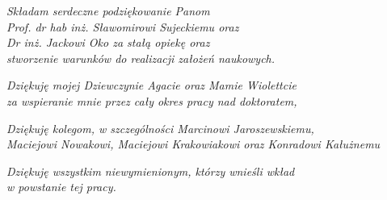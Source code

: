 


\begin{flushleft}
\vspace{1cm}
\emph{Składam serdeczne podziękowanie Panom \\
Prof. dr hab inż. Sławomirowi Sujeckiemu oraz \\
Dr inż. Jackowi Oko za stałą opiekę oraz \\
stworzenie warunków do realizacji założeń naukowych.
}

\vspace{1cm}
\emph{Dziękuję mojej Dziewczynie Agacie oraz Mamie Wiolettcie\\
za wspieranie mnie przez cały okres pracy nad doktoratem,}

\vspace{1cm}
\emph{Dziękuję kolegom, w szczególności Marcinowi Jaroszewskiemu, \\
Maciejowi Nowakowi, Maciejowi Krakowiakowi oraz Konradowi Kałużnemu}

\vspace{1cm}
\emph{Dziękuję wszystkim niewymienionym, którzy wnieśli wkład\\
w powstanie tej pracy.}
\end{flushleft}